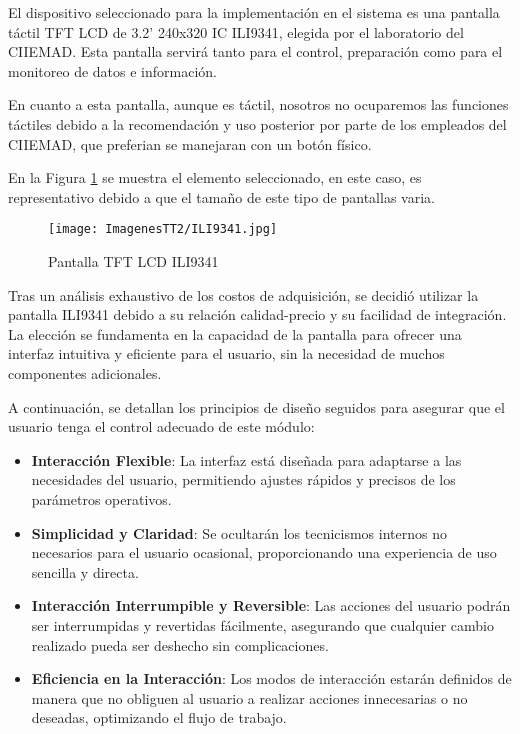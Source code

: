 \documentclass[14pt,oneside]{extarticle} %
\begin{document}
El dispositivo seleccionado para la implementación en el sistema es una pantalla táctil TFT LCD de 3.2' 240x320 IC ILI9341, elegida por el laboratorio del CIIEMAD. Esta pantalla servirá tanto para el control, preparación como para el monitoreo de datos e información.

En cuanto a esta pantalla, aunque es táctil, nosotros no ocuparemos las funciones táctiles debido a la recomendación y uso posterior por parte de los empleados del CIIEMAD, que preferian se manejaran con un botón físico. 

En la Figura \ref{fig:ILI9341Ejemplo} se muestra el elemento seleccionado, en este caso, es representativo debido a que el tamaño de este tipo de pantallas varia. 

\begin{figure}[H]
    \centering
    \texttt{[image: ImagenesTT2/ILI9341.jpg]}
    \caption{Pantalla TFT LCD ILI9341}
    \label{fig:ILI9341Ejemplo}
\end{figure}

Tras un análisis exhaustivo de los costos de adquisición, se decidió utilizar la pantalla ILI9341 debido a su relación calidad-precio y su facilidad de integración. La elección se fundamenta en la capacidad de la pantalla para ofrecer una interfaz intuitiva y eficiente para el usuario, sin la necesidad de muchos componentes adicionales. 

A continuación, se detallan los principios de diseño seguidos para asegurar que el usuario tenga el control adecuado de este módulo:

\begin{itemize}
    \item \textbf{Interacción Flexible}: La interfaz está diseñada para adaptarse a las necesidades del usuario, permitiendo ajustes rápidos y precisos de los parámetros operativos.
    \item \textbf{Simplicidad y Claridad}: Se ocultarán los tecnicismos internos no necesarios para el usuario ocasional, proporcionando una experiencia de uso sencilla y directa.
    \item \textbf{Interacción Interrumpible y Reversible}: Las acciones del usuario podrán ser interrumpidas y revertidas fácilmente, asegurando que cualquier cambio realizado pueda ser deshecho sin complicaciones.
    \item \textbf{Eficiencia en la Interacción}: Los modos de interacción estarán definidos de manera que no obliguen al usuario a realizar acciones innecesarias o no deseadas, optimizando el flujo de trabajo.
\end{itemize}
\end{document}
